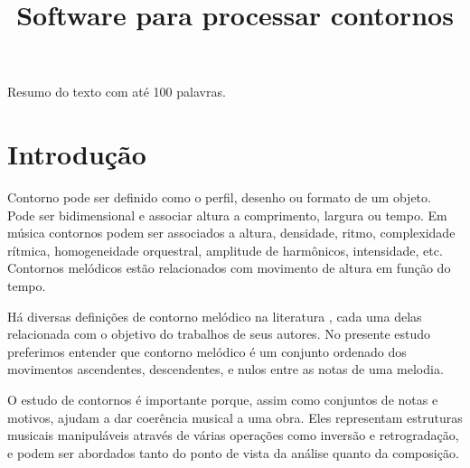 \documentclass[brazil]{article}
\begin{document}
\graphicspath{{figs-out/}{out/}}

\title{Software para processar contornos}
\author{}{}{}{}

\begin{sumario}
  Resumo do texto com até 100 palavras.  
\end{sumario}








\section{Introdução}
\label{sec:introducao}

Contorno pode ser definido como o perfil, desenho ou formato de um
objeto. Pode ser bidimensional e associar altura a comprimento,
largura ou tempo. Em música contornos podem ser associados a altura,
densidade, ritmo, complexidade rítmica, homogeneidade orquestral,
amplitude de harmônicos, intensidade, etc. Contornos melódicos estão
relacionados com movimento de altura em função do tempo.

Há diversas definições de contorno melódico na literatura
\cite{piston59:harmony,toch77:shaping,schonberg:fundamentals,adams76:melodic,marvin.ea87:relating,morris87:composition,clifford95:contour,beard03:contour},
cada uma delas relacionada com o objetivo do trabalhos de seus
autores. No presente estudo preferimos entender que contorno melódico
é um conjunto ordenado dos movimentos ascendentes, descendentes, e
nulos entre as notas de uma melodia.


O estudo de contornos é importante porque, assim como conjuntos de
notas e motivos, ajudam a dar coerência musical a uma obra. Eles
representam estruturas musicais manipuláveis através de várias
operações como inversão e retrogradação, e podem ser abordados tanto
do ponto de vista da análise quanto da composição.
\end{document}
